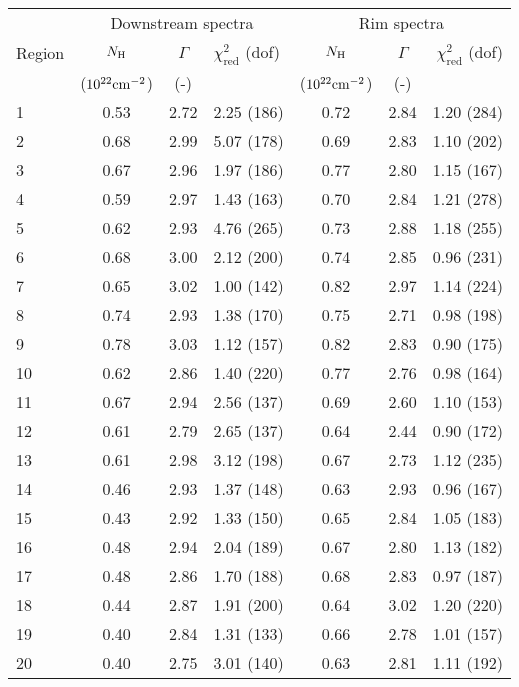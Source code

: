 \begin{tabular}{@{}lcclccr@{}}
\toprule
{} & \multicolumn{3}{c}{Downstream spectra}
   & \multicolumn{3}{c}{Rim spectra} \\
\cmidrule(lr){2-4} \cmidrule(l){5-7}
Region & $N_{\mathrm{H}}$ & $\Gamma$ & $\chi^2_{\mathrm{red}}$ (dof)
       & $N_{\mathrm{H}}$ & $\Gamma$ & $\chi^2_{\mathrm{red}}$ (dof) \\
{} & ($10^{22} \mathrm{cm}^{-2}$) & (-) & {}
   & ($10^{22} \mathrm{cm}^{-2}$) & (-) & {} \\
\midrule
 1 & 0.53 & 2.72 & 2.25 (186) & 0.72 & 2.84 & 1.20 (284) \\
 2 & 0.68 & 2.99 & 5.07 (178) & 0.69 & 2.83 & 1.10 (202) \\
 3 & 0.67 & 2.96 & 1.97 (186) & 0.77 & 2.80 & 1.15 (167) \\
\cmidrule{1-7}
 4 & 0.59 & 2.97 & 1.43 (163) & 0.70 & 2.84 & 1.21 (278) \\
 5 & 0.62 & 2.93 & 4.76 (265) & 0.73 & 2.88 & 1.18 (255) \\
 6 & 0.68 & 3.00 & 2.12 (200) & 0.74 & 2.85 & 0.96 (231) \\
 7 & 0.65 & 3.02 & 1.00 (142) & 0.82 & 2.97 & 1.14 (224) \\
 8 & 0.74 & 2.93 & 1.38 (170) & 0.75 & 2.71 & 0.98 (198) \\
 9 & 0.78 & 3.03 & 1.12 (157) & 0.82 & 2.83 & 0.90 (175) \\
10 & 0.62 & 2.86 & 1.40 (220) & 0.77 & 2.76 & 0.98 (164) \\
\cmidrule{1-7}
11 & 0.67 & 2.94 & 2.56 (137) & 0.69 & 2.60 & 1.10 (153) \\
12 & 0.61 & 2.79 & 2.65 (137) & 0.64 & 2.44 & 0.90 (172) \\
13 & 0.61 & 2.98 & 3.12 (198) & 0.67 & 2.73 & 1.12 (235) \\
\cmidrule{1-7}
14 & 0.46 & 2.93 & 1.37 (148) & 0.63 & 2.93 & 0.96 (167) \\
15 & 0.43 & 2.92 & 1.33 (150) & 0.65 & 2.84 & 1.05 (183) \\
16 & 0.48 & 2.94 & 2.04 (189) & 0.67 & 2.80 & 1.13 (182) \\
17 & 0.48 & 2.86 & 1.70 (188) & 0.68 & 2.83 & 0.97 (187) \\
\cmidrule{1-7}
18 & 0.44 & 2.87 & 1.91 (200) & 0.64 & 3.02 & 1.20 (220) \\
19 & 0.40 & 2.84 & 1.31 (133) & 0.66 & 2.78 & 1.01 (157) \\
20 & 0.40 & 2.75 & 3.01 (140) & 0.63 & 2.81 & 1.11 (192) \\
\bottomrule
\end{tabular}
